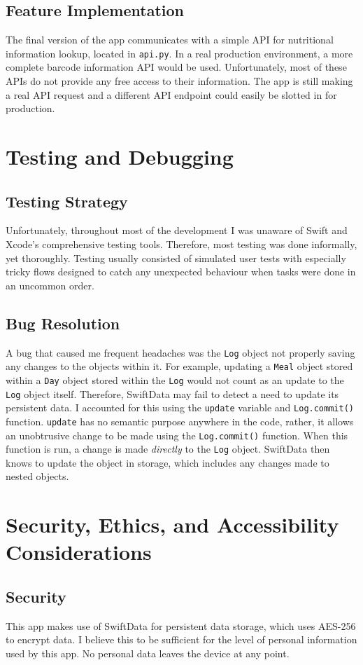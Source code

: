\documentclass[11pt, oneside]{article}   	%
\begin{document}
\subsection{Feature Implementation}
The final version of the app communicates with a simple API for nutritional information lookup, located in \verb|api.py|. In a real production environment, a more complete barcode information API would be used. Unfortunately, most of these APIs do not provide any free access to their information. The app is still making a real API request and a different API endpoint could easily be slotted in for production.
\section{Testing and Debugging}
\subsection{Testing Strategy}
Unfortunately, throughout most of the development I was unaware of Swift and Xcode's comprehensive testing tools. Therefore, most testing was done informally, yet thoroughly. Testing usually consisted of simulated user tests with especially tricky flows designed to catch any unexpected behaviour when tasks were done in an uncommon order.
\subsection{Bug Resolution}
A bug that caused me frequent headaches was the \verb|Log| object not properly saving any changes to the objects within it. For example, updating a \verb|Meal| object stored within a \verb|Day| object stored within the \verb|Log| would not count as an update to the \verb|Log| object itself. Therefore, SwiftData may fail to detect a need to update its persistent data. I accounted for this using the \verb|update| variable and \verb|Log.commit()| function. \verb|update| has no semantic purpose anywhere in the code, rather, it allows an unobtrusive change to be made using the \verb|Log.commit()| function. When this function is run, a change is made \emph{directly} to the \verb|Log| object. SwiftData then knows to update the object in storage, which includes any changes made to nested objects. 
\section{Security, Ethics, and Accessibility Considerations}
\subsection{Security}
This app makes use of SwiftData for persistent data storage, which uses AES-256 to encrypt data. I believe this to be sufficient for the level of personal information used by this app. No personal data leaves the device at any point.
\end{document}
